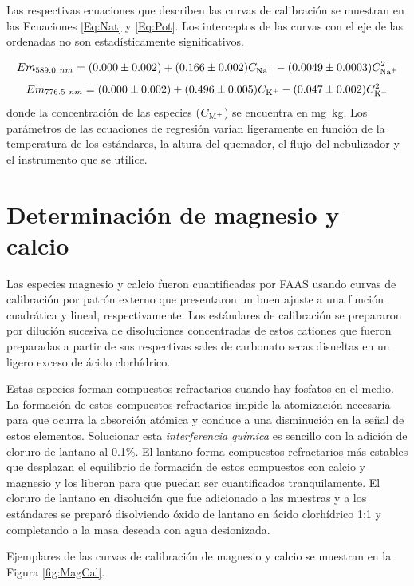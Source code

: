 Las respectivas ecuaciones que describen las curvas de calibración se muestran en las Ecuaciones \ref{Eq:Nat} y \ref{Eq:Pot}. Los interceptos de las curvas con el eje de las ordenadas no son estadísticamente significativos.

\vspace{-0.8cm}
\begin{equation}\label{Eq:Nat}
    Em_{589.0~nm}=(0.000\pm0.002)+(0.166\pm0.002) C_{\ce{Na^+}} - (0.0049\pm0.0003) C_{\ce{Na^+}}^2
\end{equation}
\begin{equation}\label{Eq:Pot}
    Em_{776.5~nm}=(0.000\pm0.002)+(0.496\pm0.005) C_{\ce{K^+}} - (0.047\pm0.002) C_{\ce{K^+}}^2
\end{equation}
donde la concentración de las especies ($C_{\ce{M^+}}$) se encuentra en mg~kg\mnn. Los parámetros de las ecuaciones de regresión varían ligeramente en función de la temperatura de los estándares, la altura del quemador, el flujo del nebulizador y el instrumento que se utilice.

\section{Determinación de magnesio y calcio}
Las especies magnesio y calcio fueron cuantificadas por \ac{FAAS} usando curvas de calibración por patrón externo que presentaron un buen ajuste a una función cuadrática y lineal, respectivamente. Los estándares de calibración se prepararon por dilución sucesiva de di\-so\-luciones concentradas de estos cationes que fueron preparadas a partir de sus respectivas sales de carbonato secas disueltas en un ligero exceso de ácido clorhídrico.

Estas especies forman compuestos refractarios cuando hay fosfatos en el medio. La formación de estos compuestos refractarios impide la atomización necesaria para que ocurra la absorción atómica y conduce a una disminución en la señal de estos elementos. Solucionar esta \textit{interferencia química} es sencillo con la adición de cloruro de lantano al 0.1\%. El lantano forma compuestos refractarios más estables que desplazan el equilibrio de formación de estos compuestos con calcio y magnesio y los liberan para que puedan ser cuantificados tranquilamente. El cloruro de lantano en disolución que fue adicionado a las muestras y a los estándares se preparó disolviendo óxido de lantano en ácido clorhídrico 1:1 y completando a la masa deseada con agua desionizada.

Ejemplares de las curvas de calibración de magnesio y calcio se muestran en la Figura \ref{fig:MagCal}.

